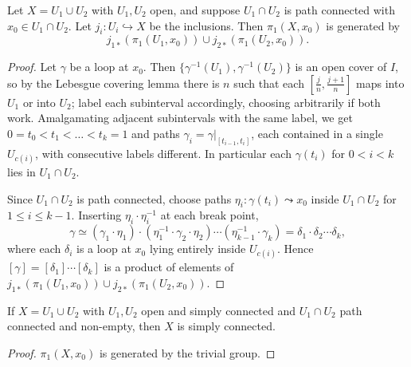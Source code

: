 \documentclass[a4paper]{scrartcl}
\begin{document}
\begin{theorem} \label{thm:vk-generation}
	Let $X = U_1 \cup U_2$ with $U_1, U_2$ open, and suppose $U_1 \cap U_2$ is path connected with $x_0 \in U_1 \cap U_2$. Let $j_i: U_i \hookrightarrow X$ be the inclusions. Then $\pi_1(X, x_0)$ is generated by
	$$
	j_{1*}(\pi_1(U_1,x_0)) \cup j_{2*}(\pi_1(U_2,x_0)).
	$$
\end{theorem}
\begin{proof}
	Let $\gamma$ be a loop at $x_0$. Then $\{\gamma^{-1}(U_1), \gamma^{-1}(U_2)\}$ is an open cover of $I$, so by the Lebesgue covering lemma there is $n$ such that each $[\frac{j}{n},\frac{j+1}{n}]$ maps into $U_1$ or into $U_2$; label each subinterval accordingly, choosing arbitrarily if both work. Amalgamating adjacent subintervals with the same label, we get $0 = t_0 < t_1 < \dots < t_k = 1$ and paths $\gamma_i = \gamma|_{[t_{i-1},t_i]}$, each contained in a single $U_{c(i)}$, with consecutive labels different. In particular each $\gamma(t_i)$ for $0 < i < k$ lies in $U_1 \cap U_2$.

	Since $U_1 \cap U_2$ is path connected, choose paths $\eta_i: \gamma(t_i) \leadsto x_0$ inside $U_1 \cap U_2$ for $1 \leq i \leq k-1$. Inserting $\eta_i \cdot \eta_i^{-1}$ at each break point,
	$$
	\gamma \simeq (\gamma_1\cdot\eta_1)\cdot(\eta_1^{-1}\cdot\gamma_2\cdot\eta_2)\cdots(\eta_{k-1}^{-1}\cdot\gamma_k) = \delta_1 \cdot \delta_2 \cdots \delta_k,
	$$
	where each $\delta_i$ is a loop at $x_0$ lying entirely inside $U_{c(i)}$. Hence $[\gamma] = [\delta_1]\cdots[\delta_k]$ is a product of elements of $j_{1*}(\pi_1(U_1,x_0)) \cup j_{2*}(\pi_1(U_2,x_0))$.
\end{proof}

\begin{center}
\end{center}

\begin{corollary} \label{cor:sphere-sc}
	If $X = U_1 \cup U_2$ with $U_1, U_2$ open and simply connected and $U_1 \cap U_2$ path connected and non-empty, then $X$ is simply connected.
\end{corollary}
\begin{proof}
	$\pi_1(X, x_0)$ is generated by the trivial group.
\end{proof}
\end{document}
